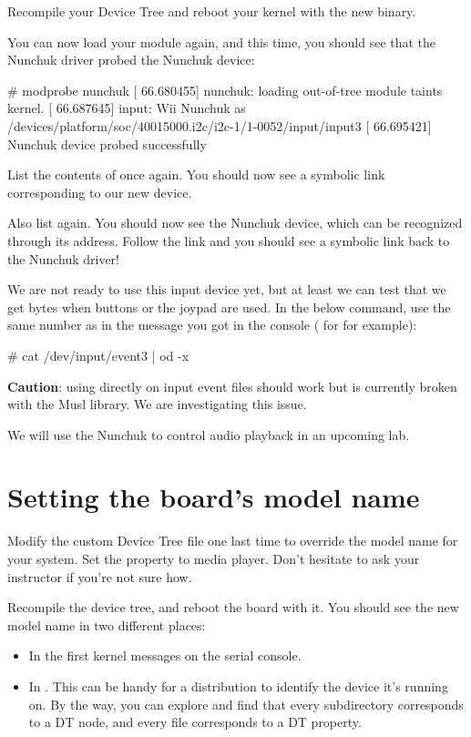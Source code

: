 Recompile your Device Tree and reboot your kernel with the new binary.

You can now load your module again, and this time, you should see that
the Nunchuk driver probed the Nunchuk device:

\begin{bashinput}
# modprobe nunchuk
[   66.680455] nunchuk: loading out-of-tree module taints kernel.
[   66.687645] input: Wii Nunchuk as /devices/platform/soc/40015000.i2c/i2c-1/1-0052/input/input3
[   66.695421] Nunchuk device probed successfully
\end{bashinput}

List the contents of  once again. You
should now see a symbolic link corresponding to our new device.

Also list  again. You should now see the
Nunchuk device, which can be recognized through its  address.
Follow the link and you should see a symbolic link back to the Nunchuk
driver!

We are not ready to use this input device yet, but at least we can test
that we get bytes when buttons or the joypad are used. In the below
command, use the same number as in the message you got in the console
( for  for example):

\begin{bashinput}
# cat /dev/input/event3 | od -x
\end{bashinput}

{\bf Caution}: using  directly on input event files should
work but is currently broken with the Musl library. We are investigating
this issue.

We will use the Nunchuk to control audio playback in an upcoming lab.

\section{Setting the board's model name}

Modify the custom Device Tree file one last time to override the model
name for your system. Set the  property to \board media
player. Don't hesitate to ask your instructor if you're not sure how.

Recompile the device tree, and reboot the board with it. You should see
the new model name in two different places:

\begin{itemize}
\item In the first kernel messages on the serial console.
\item In . This can be
      handy for a distribution to identify the device it's running on.
      By the way, you can explore  and
      find that every subdirectory corresponds to a DT node, and every
      file corresponds to a DT property.
\end{itemize}

